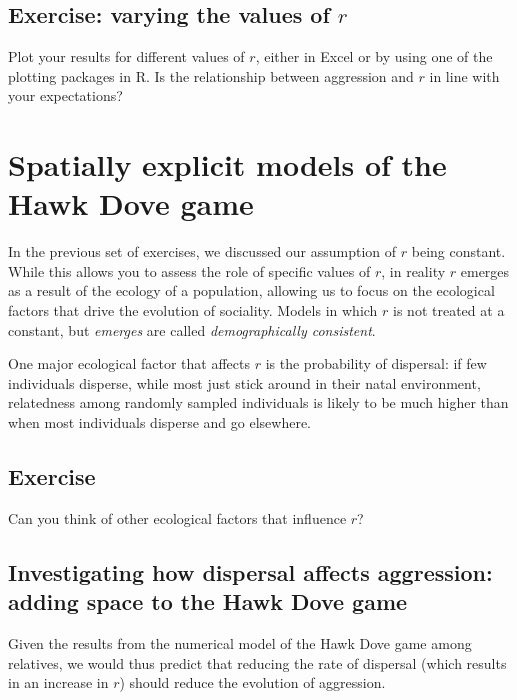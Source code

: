 \documentclass[
]{book}
\begin{document}
\section{\texorpdfstring{Exercise: varying the values of \(r\)}{Exercise: varying the values of r}}\label{exercise-varying-the-values-of-r}

Plot your results for different values of \(r\), either in Excel or by using one of the plotting packages in R. Is the relationship between aggression and \(r\) in line with your expectations?

\chapter{Spatially explicit models of the Hawk Dove game}\label{spatially-explicit-models-of-the-hawk-dove-game}

In the previous set of exercises, we discussed our assumption of \(r\) being constant. While this allows you to assess the role of specific values of \(r\), in reality \(r\) emerges as a result of the ecology of a population, allowing us to focus on the ecological factors that drive the evolution of sociality. Models in which \(r\) is not treated at a constant, but \emph{emerges} are called \emph{demographically consistent}.

One major ecological factor that affects \(r\) is the probability of dispersal: if few individuals disperse, while most just stick around in their natal environment, relatedness among randomly sampled individuals is likely to be much higher than when most individuals disperse and go elsewhere.

\section{Exercise}\label{exercise-6}

Can you think of other ecological factors that influence \(r\)?

\section{Investigating how dispersal affects aggression: adding space to the Hawk Dove game}\label{investigating-how-dispersal-affects-aggression-adding-space-to-the-hawk-dove-game}

Given the results from the numerical model of the Hawk Dove game among relatives, we would thus predict that reducing the rate of dispersal (which results in an increase in \(r\)) should reduce the evolution of aggression.
\end{document}

